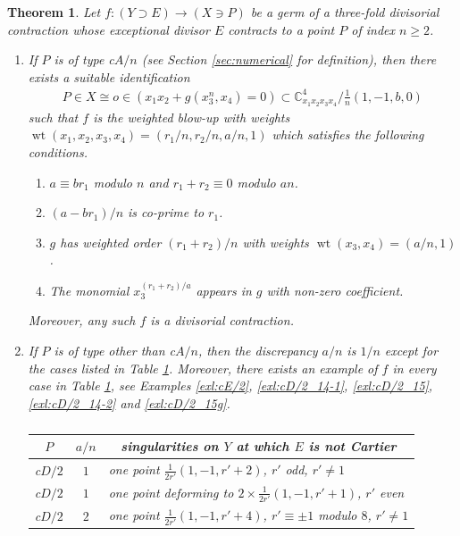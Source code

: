 \documentclass[a4paper,11pt]{amsart}
\newtheorem{theorem}{Theorem}[section]
\theoremstyle{definition}
\theoremstyle{remark}
\numberwithin{equation}{section}
\newcommand{\bC}{{\mathbb C}}
\newcommand{\wt}{\operatorname{wt}}
\begin{document}
\begin{theorem}\label{thm:MT}
Let $f\colon (Y \supset E) \to (X \ni P)$
be a germ of a three-fold divisorial contraction
whose exceptional divisor $E$ contracts to a point $P$ of index $n \ge 2$.
\begin{enumerate}
\item\label{itm:MTord}
If $P$ is of type c$A/n$
\textup{(}see Section \textup{\ref{sec:numerical}} for definition\textup{)},
then there exists a suitable identification
\begin{align*}
P \in X \cong o \in (x_1x_2+g(x_3^n,x_4)=0) \subset
\bC^4_{x_1x_2x_3x_4} /\frac{1}{n}(1,-1,b,0)
\end{align*}
such that $f$ is the weighted blow-up with weights
$\wt(x_1,x_2,x_3,x_4)=(r_1/n,r_2/n,a/n,1)$
which satisfies the following conditions.
\begin{enumerate}
\item
$a \equiv br_1$ modulo $n$ and $r_1+r_2 \equiv 0$ modulo $an$.
\item
$(a-br_1)/n$ is co-prime to $r_1$.
\item
$g$ has weighted order $(r_1+r_2)/n$
with weights $\wt(x_3,x_4)=(a/n,1)$.
\item
The monomial $x_3^{(r_1+r_2)/a}$ appears in $g$
with non-zero coefficient.
\end{enumerate}
Moreover, any such $f$ is a divisorial contraction.
\item\label{itm:MTexc}
If $P$ is of type other than c$A/n$,
then the discrepancy $a/n$ is $1/n$ except for the cases
listed in Table \textup{\ref{tbl:MT}}.
Moreover,
there exists an example of $f$ in every case in Table \textup{\ref{tbl:MT}},
see Examples \textup{\ref{exl:cE/2}}, \textup{\ref{exl:cD/2_14-1}},
\textup{\ref{exl:cD/2_15}}, \textup{\ref{exl:cD/2_14-2}} and
\textup{\ref{exl:cD/2_15g}}.
\begin{table}[ht]
\caption{}\label{tbl:MT}
\begin{tabular}{l|c|l}
\hline
\multicolumn{1}{c|}{$P$} & $a/n$ &
\multicolumn{1}{c}{\textup{singularities on $Y$
at which $E$ is not Cartier}} \\
\hline
\textup{c$D/2$}  & $1$ &
\textup{one point $\frac{1}{2r'}(1,-1,r'+2)$,
$r'$ odd, $r'\neq1$} \\[1.5pt]
\textup{c$D/2$}  & $1$ &
\textup{one point deforming to $2 \times \frac{1}{2r'}(1,-1,r'+1)$,
$r'$ even} \\[1.5pt]
\textup{c$D/2$}  & $2$ &
\textup{one point $\frac{1}{2r'}(1,-1,r'+4)$,
$r'\equiv\pm1$ modulo $8$, $r'\neq1$} \\[1.5pt]

\end{tabular}
\end{table}
\end{enumerate}
\end{theorem}
\end{document}
